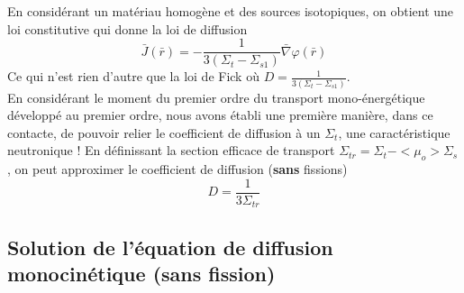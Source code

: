 En considérant un matériau homogène et des sources isotopiques, on obtient une loi constitutive 
qui donne la loi de diffusion
\begin{equation}
\bar J(\bar r) =  - \frac{1}{{3({\Sigma _t} - {\Sigma _{s1}})}}\bar \nabla \varphi (\bar r)
\end{equation}
Ce qui n'est rien d'autre que la loi de Fick où $D = \frac{1}{{3({\Sigma _t} - {\Sigma _{s1}})}}$.\\

En considérant le moment du premier ordre du transport mono-énergétique développé au premier ordre, 
nous avons établi une première manière, dans ce contacte, de pouvoir relier le coefficient de 
diffusion à un $\Sigma_t$, une caractéristique neutronique ! En définissant la section efficace 
de transport ${\Sigma _{tr}} = {\Sigma _t} -  < {\mu _o} > {\Sigma _s}$, on peut approximer le 
coefficient de diffusion (\textbf{sans} fissions)
\begin{equation}
D = \frac{1}{{3{\Sigma _{tr}}}}
\end{equation}


\subsection{Solution de l'équation de diffusion monocinétique (sans fission)}
